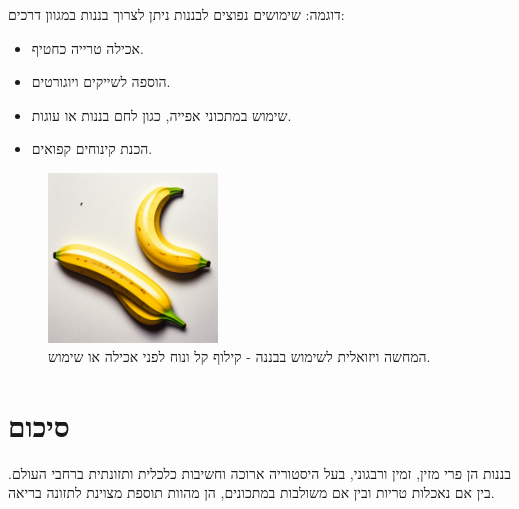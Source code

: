 \documentclass[12pt]{article}
\begin{document}
\begin{exampleBox}{דוגמה: שימושים נפוצים לבננות}
ניתן לצרוך בננות במגוון דרכים:
\begin{itemize}
    \item אכילה טרייה כחטיף.
    \item הוספה לשייקים ויוגורטים.
    \item שימוש במתכוני אפייה, כגון לחם בננות או עוגות.
    \item הכנת קינוחים קפואים.
\end{itemize}
\end{exampleBox}

\begin{figure}[H]
  \centering
  \includegraphics[width=0.4\textwidth]{files/peeling_banana.png}
  \caption{\hebrewfont המחשה ויזואלית לשימוש בבננה - קילוף קל ונוח לפני אכילה או שימוש.}
\end{figure}

\section*{סיכום}

בננות הן פרי מזין, זמין ורבגוני, בעל היסטוריה ארוכה וחשיבות כלכלית ותזונתית ברחבי העולם. בין אם נאכלות טריות ובין אם משולבות במתכונים, הן מהוות תוספת מצוינת לתזונה בריאה.
\end{document}
